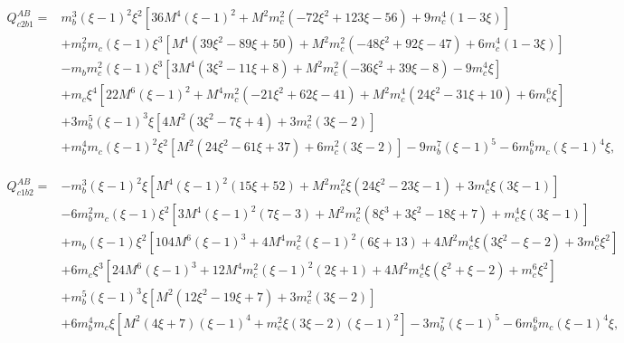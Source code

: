 \documentclass[11pt]{article}
\begin{document}
\begin{landscape}
\begin{align}
Q^{AB}_{c2b1}={}&
m_b^3(\xi-1)^2\xi^2
\left[36M^4(\xi-1)^2+M^2m_c^2(-72\xi^2+123\xi-56)+9m_c^4(1-3\xi)\right]\nonumber\\
&+m_b^2m_c(\xi-1)\xi^3
\left[M^4(39\xi^2-89\xi+50)+M^2m_c^2(-48\xi^2+92\xi-47)+6m_c^4(1-3\xi)\right]\nonumber\\
&-m_bm_c^2(\xi-1)\xi^3
\left[3M^4(3\xi^2-11\xi+8)+M^2m_c^2(-36\xi^2+39\xi-8)-9m_c^4\xi\right]\nonumber\\
&+m_c\xi^4
\left[22M^6(\xi-1)^2+M^4m_c^2(-21\xi^2+62\xi-41)
+M^2m_c^4(24\xi^2-31\xi+10)+6m_c^6\xi\right]\nonumber\\
&+3m_b^5(\xi-1)^3\xi
\left[4M^2(3\xi^2-7\xi+4)+3m_c^2(3\xi-2)\right]\nonumber\\
&+m_b^4m_c(\xi-1)^2\xi^2
\left[M^2(24\xi^2-61\xi+37)+6m_c^2(3\xi-2)\right]
-9m_b^7(\xi-1)^5-6m_b^6m_c(\xi-1)^4\xi,
\end{align}

\begin{align}
Q^{AB}_{c1b2}={}&
-m_b^3(\xi-1)^2\xi
\left[M^4(\xi-1)^2(15\xi+52)+M^2m_c^2\xi(24\xi^2-23\xi-1)+3m_c^4\xi(3\xi-1)\right]\nonumber\\
&-6m_b^2m_c(\xi-1)\xi^2
\left[3M^4(\xi-1)^2(7\xi-3)+M^2m_c^2(8\xi^3+3\xi^2-18\xi+7)+m_c^4\xi(3\xi-1)\right]\nonumber\\
&+m_b(\xi-1)\xi^2
\left[104M^6(\xi-1)^3+4M^4m_c^2(\xi-1)^2(6\xi+13)
+4M^2m_c^4\xi(3\xi^2-\xi-2)+3m_c^6\xi^2\right]\nonumber\\
&+6m_c\xi^3
\left[24M^6(\xi-1)^3+12M^4m_c^2(\xi-1)^2(2\xi+1)
+4M^2m_c^4\xi(\xi^2+\xi-2)+m_c^6\xi^2\right]\nonumber\\
&+m_b^5(\xi-1)^3\xi
\left[M^2(12\xi^2-19\xi+7)+3m_c^2(3\xi-2)\right]\nonumber\\
&+6m_b^4m_c\xi
\left[M^2(4\xi+7)(\xi-1)^4+m_c^2\xi(3\xi-2)(\xi-1)^2\right]
-3m_b^7(\xi-1)^5-6m_b^6m_c(\xi-1)^4\xi,
\end{align}


\end{landscape}
\end{document}
